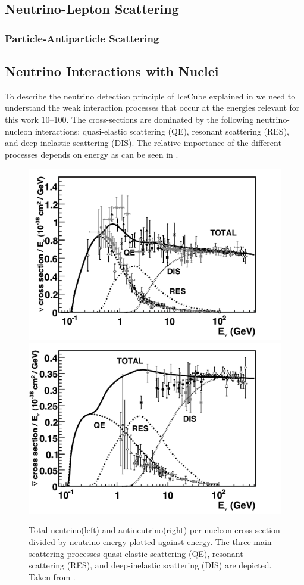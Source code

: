 \subsection{Neutrino-Lepton Scattering}

\subsubsection{Particle-Antiparticle Scattering}


\subsection{Neutrino Interactions with Nuclei}

To describe the neutrino detection principle of IceCube explained in  we need to understand the weak interaction processes that occur at the energies relevant for this work \SIrange[range-phrase=-]{10}{100}{\gev}.
The cross-sections are dominated by the following neutrino-nucleon interactions: quasi-elastic scattering (QE), resonant scattering (RES), and deep inelastic scattering (DIS).
The relative importance of the different processes depends on energy as can be seen in .

\begin{figure}[ht]
	\centering
    \includegraphics[width=0.495\linewidth]{figures/neutrinos_properties/cc_inclusive_nu.pdf}
    \includegraphics[width=0.495\linewidth]{figures/neutrinos_properties/cc_inclusive_nubar.pdf}
	\caption[Total inclusive neutrino-nucleon cross-sections, taken from \cite{Formaggio_Cross_Sections}.]{Total neutrino(left) and antineutrino(right) per nucleon cross-section divided by neutrino energy plotted against energy.
    The three main scattering processes quasi-elastic scattering (QE), resonant scattering (RES), and deep-inelastic scattering (DIS) are depicted. Taken from \cite{Formaggio_Cross_Sections}.}
\end{figure}

